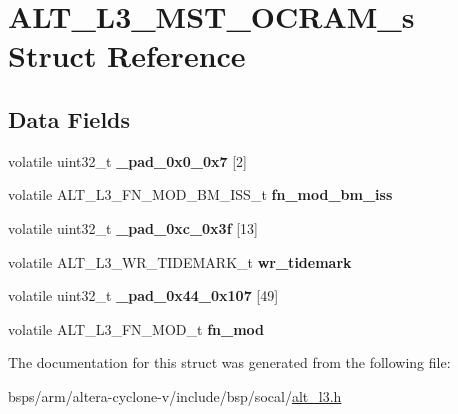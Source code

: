 \hypertarget{structALT__L3__MST__OCRAM__s}{}\section{A\+L\+T\+\_\+\+L3\+\_\+\+M\+S\+T\+\_\+\+O\+C\+R\+A\+M\+\_\+s Struct Reference}
\label{structALT__L3__MST__OCRAM__s}
\subsection*{Data Fields}
\begin{DoxyCompactItemize}
\item 
\mbox{\label{structALT__L3__MST__OCRAM__s_a1f90fcce3f05f8824e6adb8ccb270b39}} 
volatile uint32\+\_\+t {\bfseries \+\_\+pad\+\_\+0x0\+\_\+0x7} \mbox{[}2\mbox{]}
\item 
\mbox{\label{structALT__L3__MST__OCRAM__s_a8738371362ef0df1feda66b3db715ee1}} 
volatile A\+L\+T\+\_\+\+L3\+\_\+\+F\+N\+\_\+\+M\+O\+D\+\_\+\+B\+M\+\_\+\+I\+S\+S\+\_\+t {\bfseries fn\+\_\+mod\+\_\+bm\+\_\+iss}
\item 
\mbox{\label{structALT__L3__MST__OCRAM__s_a5593c782e20d9167da01efc3d691efd2}} 
volatile uint32\+\_\+t {\bfseries \+\_\+pad\+\_\+0xc\+\_\+0x3f} \mbox{[}13\mbox{]}
\item 
\mbox{\label{structALT__L3__MST__OCRAM__s_a6ce438afc42b867b3067da9cd13af1d4}} 
volatile A\+L\+T\+\_\+\+L3\+\_\+\+W\+R\+\_\+\+T\+I\+D\+E\+M\+A\+R\+K\+\_\+t {\bfseries wr\+\_\+tidemark}
\item 
\mbox{\label{structALT__L3__MST__OCRAM__s_a3b23168e282d0c2558ecdb06e04f5461}} 
volatile uint32\+\_\+t {\bfseries \+\_\+pad\+\_\+0x44\+\_\+0x107} \mbox{[}49\mbox{]}
\item 
\mbox{\label{structALT__L3__MST__OCRAM__s_acf9dde9b60e424803cea5802cbaf196c}} 
volatile A\+L\+T\+\_\+\+L3\+\_\+\+F\+N\+\_\+\+M\+O\+D\+\_\+t {\bfseries fn\+\_\+mod}
\end{DoxyCompactItemize}


The documentation for this struct was generated from the following file\+:\begin{DoxyCompactItemize}
\item 
bsps/arm/altera-\/cyclone-\/v/include/bsp/socal/\mbox{\hyperlink{alt__l3_8h}{alt\+\_\+l3.\+h}}\end{DoxyCompactItemize}
